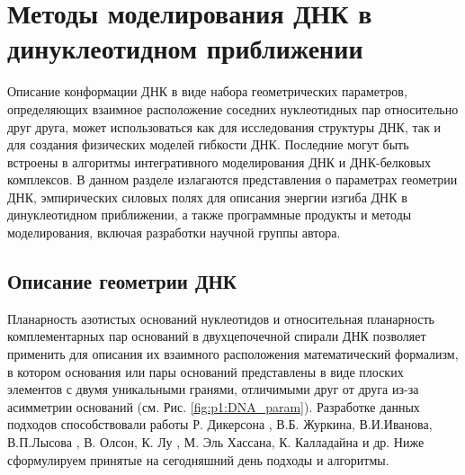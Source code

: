 \section{Методы моделирования ДНК в динуклеотидном приближении}

Описание конформации ДНК в виде набора геометрических параметров, определяющих взаимное расположение соседних нуклеотидных пар относительно друг друга, может использоваться как для исследования структуры ДНК, так и для создания физических моделей гибкости ДНК. Последние могут быть встроены в алгоритмы интегративного моделирования ДНК и ДНК-белковых комплексов. В данном разделе излагаются представления о  параметрах геометрии ДНК, эмпирических силовых полях для описания энергии изгиба ДНК в динуклеотидном приближении, а также программные продукты и методы моделирования, включая разработки научной группы автора.

\subsection{Описание геометрии ДНК}
Планарность азотистых оснований нуклеотидов и относительная планарность комплементарных пар оснований в двухцепочечной спирали ДНК позволяет применить для описания их взаимного расположения математический формализм, в котором основания или пары оснований представлены в виде плоских элементов с двумя уникальными гранями, отличимыми друг от друга из-за асимметрии оснований (см. Рис. \ref{fig:p1:DNA_param}). Разработке данных подходов способствовали работы Р. Дикерсона \cite{dickerson_definitions_1989}, В.Б. Журкина, В.И.Иванова,  В.П.Лысова \cite{zhurkin_anisotropic_1979}, В. Олсон, К. Лу \cite{lu_3dna_2003}, М. Эль Хассана, К. Калладайна \cite{el_hassan_assessment_1995} и др. Ниже сформулируем принятые на сегодняшний день подходы и алгоритмы.

